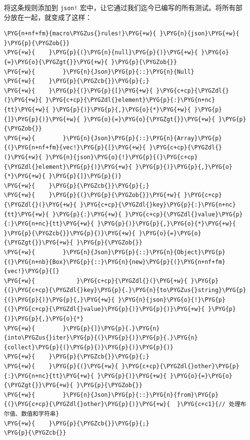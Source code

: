 将这条规则添加到 \texttt{json!} 宏中，让它通过我们迄今已编写的所有测试。将所有部分放在一起，就变成了这样：

\begin{Verbatim}[commandchars=\\\{\},breaklines=true,breakanywhere=true,fontsize=\codefont,xleftmargin=17bp]
\PYG{n+nf+fm}{macro\PYGZus{}rules!}\PYG{+w}{ }\PYG{n}{json}\PYG{+w}{ }\PYG{p}{\PYGZob{}}
\PYG{+w}{    }\PYG{p}{(}\PYG{n}{null}\PYG{p}{)}\PYG{+w}{ }\PYG{o}{=}\PYG{o}{\PYGZgt{}}\PYG{+w}{ }\PYG{p}{\PYGZob{}}
\PYG{+w}{        }\PYG{n}{Json}\PYG{p}{::}\PYG{n}{Null}
\PYG{+w}{    }\PYG{p}{\PYGZcb{}}\PYG{p}{;}
\PYG{+w}{    }\PYG{p}{(}\PYG{p}{[}\PYG{+w}{ }\PYG{c+cp}{\PYGZdl{}(}\PYG{+w}{ }\PYG{c+cp}{\PYGZdl{}element}\PYG{p}{:}\PYG{n+nc}{tt}\PYG{+w}{ }\PYG{p}{)}\PYG{p}{,}\PYG{o}{*}\PYG{+w}{ }\PYG{p}{]}\PYG{p}{)}\PYG{+w}{ }\PYG{o}{=}\PYG{o}{\PYGZgt{}}\PYG{+w}{ }\PYG{p}{\PYGZob{}}
\PYG{+w}{        }\PYG{n}{Json}\PYG{p}{::}\PYG{n}{Array}\PYG{p}{(}\PYG{n+nf+fm}{vec!}\PYG{p}{[}\PYG{+w}{ }\PYG{c+cp}{\PYGZdl{}(}\PYG{+w}{ }\PYG{n}{json}\PYG{o}{!}\PYG{p}{(}\PYG{c+cp}{\PYGZdl{}element}\PYG{p}{)}\PYG{+w}{ }\PYG{p}{)}\PYG{p}{,}\PYG{o}{*}\PYG{+w}{ }\PYG{p}{]}\PYG{p}{)}
\PYG{+w}{    }\PYG{p}{\PYGZcb{}}\PYG{p}{;}
\PYG{+w}{    }\PYG{p}{(}\PYG{p}{\PYGZob{}}\PYG{+w}{ }\PYG{c+cp}{\PYGZdl{}(}\PYG{+w}{ }\PYG{c+cp}{\PYGZdl{}key}\PYG{p}{:}\PYG{n+nc}{tt}\PYG{+w}{ }\PYG{p}{:}\PYG{+w}{ }\PYG{c+cp}{\PYGZdl{}value}\PYG{p}{:}\PYG{n+nc}{tt}\PYG{+w}{ }\PYG{p}{)}\PYG{p}{,}\PYG{o}{*}\PYG{+w}{ }\PYG{p}{\PYGZcb{}}\PYG{p}{)}\PYG{+w}{ }\PYG{o}{=}\PYG{o}{\PYGZgt{}}\PYG{+w}{ }\PYG{p}{\PYGZob{}}
\PYG{+w}{        }\PYG{n}{Json}\PYG{p}{::}\PYG{n}{Object}\PYG{p}{(}\PYG{n+nb}{Box}\PYG{p}{::}\PYG{n}{new}\PYG{p}{(}\PYG{n+nf+fm}{vec!}\PYG{p}{[}
\PYG{+w}{            }\PYG{c+cp}{\PYGZdl{}(}\PYG{+w}{ }\PYG{p}{(}\PYG{c+cp}{\PYGZdl{}key}\PYG{p}{.}\PYG{n}{to\PYGZus{}string}\PYG{p}{(}\PYG{p}{)}\PYG{p}{,}\PYG{+w}{ }\PYG{n}{json}\PYG{o}{!}\PYG{p}{(}\PYG{c+cp}{\PYGZdl{}value}\PYG{p}{)}\PYG{p}{)}\PYG{+w}{ }\PYG{p}{)}\PYG{p}{,}\PYG{o}{*}
\PYG{+w}{        }\PYG{p}{]}\PYG{p}{.}\PYG{n}{into\PYGZus{}iter}\PYG{p}{(}\PYG{p}{)}\PYG{p}{.}\PYG{n}{collect}\PYG{p}{(}\PYG{p}{)}\PYG{p}{)}\PYG{p}{)}
\PYG{+w}{    }\PYG{p}{\PYGZcb{}}\PYG{p}{;}
\PYG{+w}{    }\PYG{p}{(}\PYG{+w}{ }\PYG{c+cp}{\PYGZdl{}other}\PYG{p}{:}\PYG{n+nc}{tt}\PYG{+w}{ }\PYG{p}{)}\PYG{+w}{ }\PYG{o}{=}\PYG{o}{\PYGZgt{}}\PYG{+w}{ }\PYG{p}{\PYGZob{}}
\PYG{+w}{        }\PYG{n}{Json}\PYG{p}{::}\PYG{n}{from}\PYG{p}{(}\PYG{c+cp}{\PYGZdl{}other}\PYG{p}{)}\PYG{+w}{  }\PYG{c+c1}{// 处理布尔值、数值和字符串}
\PYG{+w}{    }\PYG{p}{\PYGZcb{}}\PYG{p}{;}
\PYG{p}{\PYGZcb{}}
\end{Verbatim}

